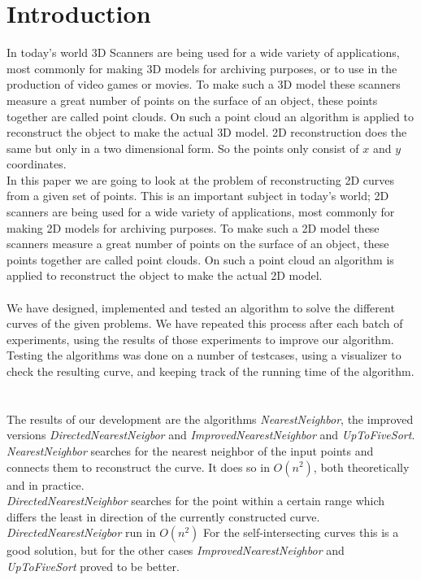 \section{Introduction}
\label{sec:Introduction}
In today's world 3D Scanners are being used for a wide variety of applications, most commonly for making 3D models for archiving purposes, or to use in the production of video games or movies.
To make such a 3D model these scanners measure a great number of points on the surface of an object, these points together are called point clouds. On such a point cloud an algorithm is applied to reconstruct the object to make the actual 3D model.
2D reconstruction does the same but only in a two dimensional form. So the points only consist of $x$ and $y$ coordinates.
\\
In this paper we are going to look at the problem of reconstructing 2D curves from a given set of points. This is an important subject in today's world; 2D scanners are being used for a wide variety of applications, most commonly for making 2D models for archiving purposes. To make such a 2D model these scanners measure a great number of points on the surface of an object, these points together are called point clouds. On such a point cloud an algorithm is applied to reconstruct the object to make the actual 2D model.\\ \\
We have designed, implemented and tested an algorithm to solve the different curves of the given problems. We have repeated this process after each batch of experiments, using the results of those experiments to improve our algorithm. Testing the algorithms was done on a number of testcases, using a visualizer to check the resulting curve, and keeping track of the running time of the algorithm.\\ \\ \\
The results of our development are the algorithms \textit{NearestNeighbor}, the improved versions \textit{DirectedNearestNeigbor} and \textit{ImprovedNearestNeighbor} and \emph{UpToFiveSort}. \\
\textit{NearestNeighbor} searches for the nearest neighbor of the input points and connects them to reconstruct the curve. It does so in $O(n^{2})$, both theoretically and in practice. \\
\textit{DirectedNearestNeighbor} searches for the point within a certain range which differs the least in direction of the currently constructed curve. \emph{DirectedNearestNeigbor} run in $O(n^{2})$ For the self-intersecting curves this is a good solution, but for the other cases \textit{ImprovedNearestNeighbor} and \textit{UpToFiveSort} proved to be better. \\
